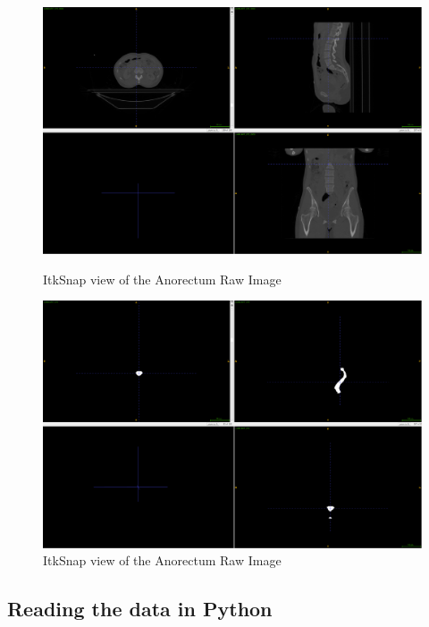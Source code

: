 \documentclass[11pt]{article}
\begin{document}
\begin{figure}[H]
    \centering
    \captionsetup{width=0.45\textwidth}
    \begin{minipage}{.5\textwidth}
        \centering
        \includegraphics[width=\linewidth]{images/AnorectumImage.png}
        \caption{ItkSnap view of the Anorectum Raw Image}\label{fig:AnorectumImage}
    \end{minipage}%
    \begin{minipage}{.5\textwidth}
        \centering
        \includegraphics[width=\linewidth]{images/AnorectumLabel.png}
        \caption{ItkSnap view of the Anorectum Raw Image}\label{fig:AnorectumLabel}
    \end{minipage}%
\end{figure} 

\subsection{Reading the data in Python}
\end{document}
